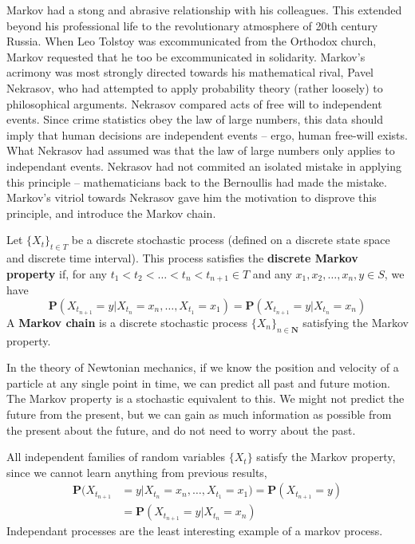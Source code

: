 Markov had a stong and abrasive relationship with his colleagues. This extended beyond his professional life to the revolutionary atmosphere of 20th century Russia. When Leo Tolstoy was excommunicated from the Orthodox church, Markov requested that he too be excommunicated in solidarity. Markov's acrimony was most strongly directed towards his mathematical rival, Pavel Nekrasov, who had attempted to apply probability theory (rather loosely) to philosophical arguments. Nekrasov compared acts of free will to independent events. Since crime statistics obey the law of large numbers, this data should imply that human decisions are independent events -- ergo, human free-will exists. What Nekrasov had assumed was that the law of large numbers only applies to independant events. Nekrasov had not commited an isolated mistake in applying this principle -- mathematicians back to the Bernoullis had made the mistake. Markov's vitriol towards Nekrasov gave him the motivation to disprove this principle, and introduce the Markov chain.

\begin{definition}
    Let $\{ X_t \}_{t \in T}$ be a discrete stochastic process (defined on a discrete state space and discrete time interval). This process satisfies the {\bf discrete Markov property} if, for any $t_1 < t_2 < \dots < t_n < t_{n+1} \in T$ and any $x_1, x_2, \dots, x_n, y \in S$, we have
    \[ \mathbf{P}(X_{t_{n+1}} = y | X_{t_n} = x_n, \dots, X_{t_1} = x_1) = \mathbf{P}(X_{t_{n+1}} = y | X_{t_n} = x_{n}) \]
    A {\bf Markov chain} is a discrete stochastic process $\{ X_n \}_{n \in \mathbf{N}}$ satisfying the Markov property.
\end{definition}

In the theory of Newtonian mechanics, if we know the position and velocity of a particle at any single point in time, we can predict all past and future motion. The Markov property is a stochastic equivalent to this. We might not predict the future from the present, but we can gain as much information as possible from the present about the future, and do not need to worry about the past.

\begin{example}
    All independent families of random variables $\{ X_t \}$ satisfy the Markov property, since we cannot learn anything from previous results,
    \begin{align*}
        \mathbf{P}(X_{t_{n+1}} &= y | X_{t_n} = x_n, \dots, X_{t_1} = x_1) = \mathbf{P}(X_{t_{n+1}} = y)\\
        &= \mathbf{P}(X_{t_{n+1}} = y | X_{t_n} = x_n)
    \end{align*}
    Independant processes are the least interesting example of a markov process.
\end{example}

